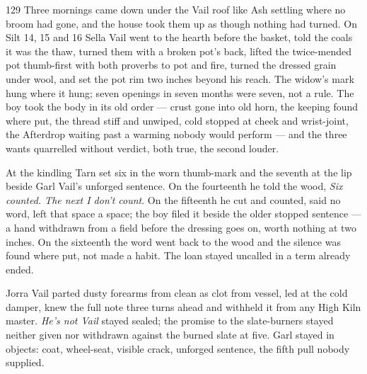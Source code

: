 
\scenebreak


\scenebreak


\scenebreak

\CRtailpiece
\begin{CRchronicle}{129}
Three mornings came down under the Vail roof like Ash settling where no broom had gone, and the house took them up as though nothing had turned. On Silt 14, 15 and 16 Sella Vail went to the hearth before the basket, told the coals it was the thaw, turned them with a broken pot’s back, lifted the twice-mended pot thumb-first with both proverbs to pot and fire, turned the dressed grain under wool, and set the pot rim two inches beyond his reach. The widow’s mark hung where it hung; seven openings in seven months were seven, not a rule. The boy took the body in its old order — crust gone into old horn, the keeping found where put, the thread stiff and unwiped, cold stopped at cheek and wrist-joint, the Afterdrop waiting past a warming nobody would perform — and the three wants quarrelled without verdict, both true, the second louder.

At the kindling Tarn set six in the worn thumb-mark and the seventh at the lip beside Garl Vail’s unforged sentence. On the fourteenth he told the wood, \emph{Six counted. The next I don’t count}. On the fifteenth he cut and counted, said no word, left that space a space; the boy filed it beside the older stopped sentence — a hand withdrawn from a field before the dressing goes on, worth nothing at two inches. On the sixteenth the word went back to the wood and the silence was found where put, not made a habit. The loan stayed uncalled in a term already ended.

Jorra Vail parted dusty forearms from clean as clot from vessel, led at the cold damper, knew the full note three turns ahead and withheld it from any High Kiln master. \emph{He’s not Vail} stayed sealed; the promise to the slate-burners stayed neither given nor withdrawn against the burned slate at five. Garl stayed in objects: coat, wheel-seat, visible crack, unforged sentence, the fifth pull nobody supplied.


\end{CRchronicle}
